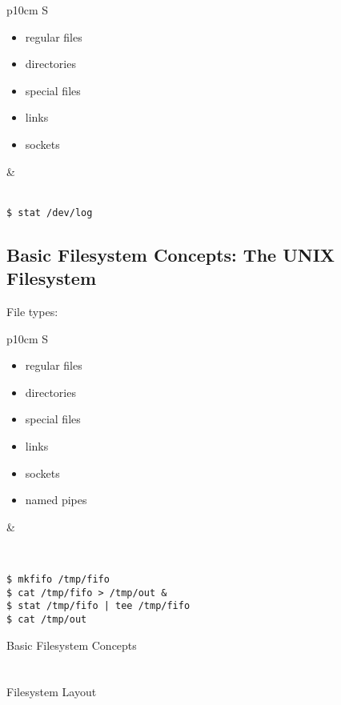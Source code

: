 \documentclass[xga]{xdvislides}
\begin{document}
\begin{tabular}{ p{10cm} S }
\begin{itemize}
	\item regular files
	\item directories
	\item special files
	\item links
	\item sockets
\end{itemize}
&  \\
\end{tabular}
\\

\verb+$ stat /dev/log+

\subsection{Basic Filesystem Concepts: The UNIX Filesystem}
File types:
\\

\begin{tabular}{ p{10cm} S }
\begin{itemize}
	\item regular files
	\item directories
	\item special files
	\item links
	\item sockets
	\item named pipes
\end{itemize}
&  \\
\end{tabular}
\\

\begin{verbatim}
$ mkfifo /tmp/fifo
$ cat /tmp/fifo > /tmp/out &
$ stat /tmp/fifo | tee /tmp/fifo
$ cat /tmp/out
\end{verbatim}

\newpage
\vspace*{\fill}
\begin{center}
	\Hugesize
		Basic Filesystem Concepts\\ [1em]
	\hspace*{5mm}
	\blueline\\
	\hspace*{5mm}\\
		Filesystem Layout
\end{center}
\vspace*{\fill}
\end{document}

